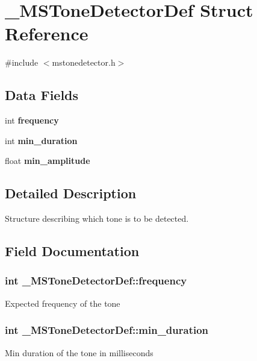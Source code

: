 \section{\_\-MSToneDetectorDef Struct Reference}
\label{struct__MSToneDetectorDef}


{\ttfamily \#include $<$mstonedetector.h$>$}\subsection*{Data Fields}
\begin{DoxyCompactItemize}
\item 
int {\bf frequency}
\item 
int {\bf min\_\-duration}
\item 
float {\bf min\_\-amplitude}
\end{DoxyCompactItemize}


\subsection{Detailed Description}
Structure describing which tone is to be detected. 

\subsection{Field Documentation}
\subsubsection[{frequency}]{\setlength{\rightskip}{0pt plus 5cm}int {\bf \_\-MSToneDetectorDef::frequency}}\label{struct__MSToneDetectorDef_a03b6327d9afaed82a4b5b5b2a6d86abb}
Expected frequency of the tone 
\subsubsection[{min\_\-duration}]{\setlength{\rightskip}{0pt plus 5cm}int {\bf \_\-MSToneDetectorDef::min\_\-duration}}\label{struct__MSToneDetectorDef_a16f301fda5e31ee37ce0a7540d72d0ce}
Min duration of the tone in milliseconds 
